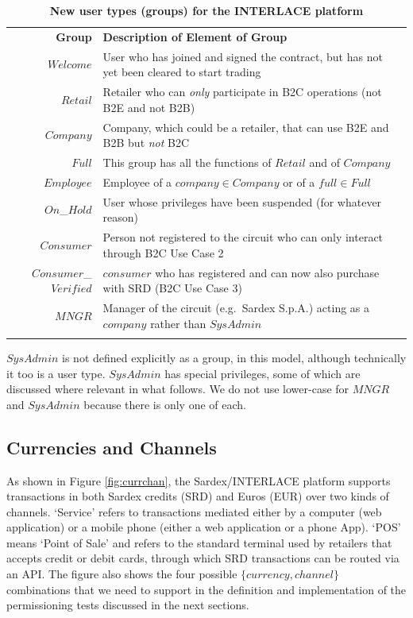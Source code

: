 \setlength{\tabcolsep}{10pt}
\begin{table}[h]
\vspace{-0.3cm}
\begin{centering}
\small
{
\begin{tabular}{ r | l  }
\hline
\textbf{Group}	& \textbf{Description of Element of Group} \\
\Xhline{1.5pt}
$Welcome$ & User who has joined and signed the contract, but has not yet been cleared to start trading \\
\hline
$Retail$ & Retailer who can \emph{only} participate in B2C operations (not B2E and not B2B) \\
\hline
$Company$ & Company, which could be a retailer, that can use B2E and B2B but \emph{not} B2C \\
\hline
$Full$ & This group has all the functions of $Retail$ and of $Company$ \\
\hline
$Employee$ & Employee of a $company\in Company$ or of a $full \in Full$ \\
\hline
$On$\_$Hold$ & User whose privileges have been suspended (for whatever reason) \\
\hline
$Consumer$ & Person not registered to the circuit who can only interact through B2C Use Case 2 \\
\hline
$Consumer$\_$Verified$ & $consumer$ who has registered and can now also purchase with SRD (B2C Use Case 3)  \\
\hline
$MNGR$ & Manager of the circuit (e.g.\ Sardex S.p.A.) acting as a $company$ rather than $SysAdmin$ \\
\Xhline{1.5pt}
\end{tabular}
}
\caption{\small\textbf{New user types (groups) for the INTERLACE platform}}
\label{tab:groups}
\end{centering}
\vspace{-0.7cm}
\end{table}

$SysAdmin$ is not defined explicitly as a group, in this model, although technically it too is a user type. $SysAdmin$ has special privileges, some of which are discussed where relevant in what follows. We do not use lower-case for $MNGR$ and $SysAdmin$ because there is only one of each.

\subsection{Currencies and Channels}
As shown in Figure \ref{fig:currchan}, the Sardex/INTERLACE platform supports transactions in both Sardex credits (SRD) and Euros (EUR) over two kinds of channels. `Service' refers to transactions mediated either by a computer (web application) or a mobile phone (either a web application or a phone App). `POS' means `Point of Sale' and refers to the standard terminal used by retailers that accepts credit or debit cards, through which SRD transactions can be routed via an API. The figure also shows the four possible $\{ currency, channel \}$ combinations that we need to support in the definition and implementation of the permissioning tests discussed in the next sections.

